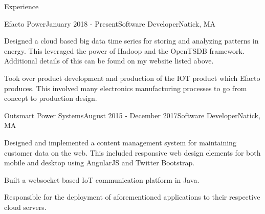 \documentclass{resume} %
\begin{document}

    \begin{rSection}{Experience}
        \begin{rSubsection}{Efacto Power}{January 2018 - Present}{Software Developer}{Natick, MA}
            \item Designed a cloud based big data time series for storing and analyzing patterns in energy.
            This leveraged the power of Hadoop and the OpenTSDB framework.
            Additional details of this can be found on my website listed above.
            \item Took over product development and production of the IOT product which Efacto produces.
            This involved many electronics manufacturing processes to go from concept to production design.
        \end{rSubsection}

        \begin{rSubsection}{Outsmart Power Systems}{August 2015 - December 2017}{Software Developer}{Natick, MA}
            \item Designed and implemented a content management system for maintaining customer data on the web.
            This included responsive web design elements for both mobile and desktop using AngularJS and Twitter Bootstrap.
            \item Built a websocket based IoT communication platform in Java.
            \item Responsible for the deployment of aforementioned applications to their respective cloud servers.
        \end{rSubsection}



    \end{rSection}

\end{document}
